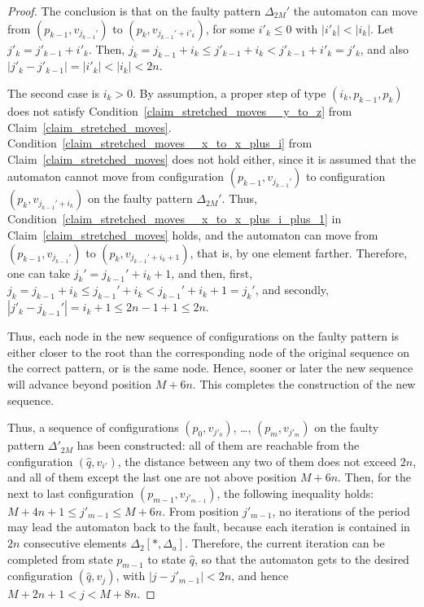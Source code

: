 \documentclass[12pt,a4paper]{article}
\theoremstyle{definition}
\begin{document}
\begin{proof}
The conclusion is that
on the faulty pattern $\Delta_{2M}'$
the automaton can move from $(p_{k-1},v_{j_{k-1}'})$
to $(p_k,v_{j_{k-1}'+i'_k})$, for some $i'_k \leqslant 0$ with $|i'_k|<|i_k|$.
Let $j'_k=j'_{k-1}+i'_k$. Then, $j_k = j_{k-1} + i_k \leqslant j'_{k-1}+i_k < j'_{k-1}+i'_k = j'_k$,
and also $|j'_k-j'_{k-1}| = |i'_k| < |i_k| <2n$.

The second case is $i_k > 0$.
By assumption, a proper step of type $(i_k,p_{k-1},p_k)$
does not satisfy Condition~\ref{claim_stretched_moves__y_to_z} from Claim~\ref{claim_stretched_moves}.
Condition~\ref{claim_stretched_moves__x_to_x_plus_i} from Claim~\ref{claim_stretched_moves}
does not hold either, since it is assumed
that the automaton cannot move
from configuration $(p_{k-1},v_{j_{k-1}'})$ to configuration $(p_k,v_{j_{k-1}'+i_k})$
on the faulty pattern $\Delta_{2M}'$.
Thus, Condition~\ref{claim_stretched_moves__x_to_x_plus_i_plus_1} in Claim~\ref{claim_stretched_moves} holds,
and the automaton can move
from $(p_{k-1},v_{j_{k-1}'})$ to $(p_k,v_{j_{k-1}'+i_k+1})$,
that is, by one element farther.
Therefore, one can take $j_k' = j_{k-1}'+i_k+1$,
and then, first, $j_k = j_{k-1}+i_k \leqslant j_{k-1}'+i_k < j_{k-1}'+i_k+1 = j_k'$,
and secondly, $|j'_k-j_{k-1}'| = i_k+1 \leqslant 2n-1+1 \leqslant 2n$.

Thus, each node in the new sequence of configurations on the faulty pattern
is either closer to the root
than the corresponding node of the original sequence on the correct pattern,
or is the same node.
Hence, sooner or later the new sequence will advance beyond position $M+6n$.
This completes the construction of the new sequence.

Thus, a sequence of configurations
$(p_0,v_{j'_0})$, \ldots, $(p_m,v_{j'_m})$
on the faulty pattern $\Delta'_{2M}$ has been constructed:
all of them are reachable from the configuration $(\widehat{q},v_{i'})$,
the distance between any two of them does not exceed $2n$,
and all of them except the last one are not above position $M+6n$.
Then, for the next to last configuration $(p_{m-1},v_{j'_{m-1}})$,
the following inequality holds: $M+4n+1 \leqslant j'_{m-1} \leqslant M+6n$.
From position $j'_{m-1}$,
no iterations of the period may lead the automaton back to the fault,
because each iteration is contained in $2n$ consecutive elements $\Delta_2[*,\Delta_a]$.
Therefore, the current iteration can be completed from state $p_{m-1}$
to state $\widehat{q}$, so that the automaton gets to the desired configuration $(\widehat{q},v_j)$,
with $|j-j'_{m-1}| < 2n$, and hence $M+2n+1 < j < M+8n$.
\end{proof}
\end{document}
